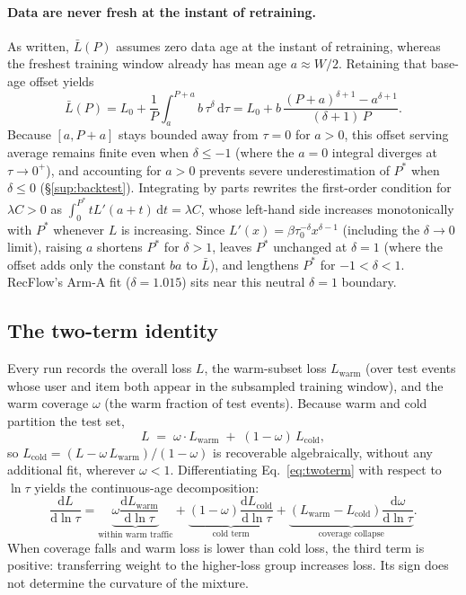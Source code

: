 \documentclass[10pt,letterpaper]{article}
\begin{document}
\paragraph{Data are never fresh at the instant of retraining.}
As written, $\bar L(P)$ assumes zero data age at the instant of retraining,
whereas the freshest training window already has mean age $a \approx W/2$.
Retaining that base-age offset yields
\[
\bar L(P) = L_0 + \frac{1}{P}\int_{a}^{P+a} \! b\,\tau^{\delta}\,
\mathrm{d}\tau
= L_0 + b\,\frac{(P+a)^{\delta+1} - a^{\delta+1}}{(\delta+1)\,P} .
\]
Because $[a, P+a]$ stays bounded away from $\tau = 0$ for $a > 0$, this offset
serving average remains finite even when $\delta \le -1$ (where the $a = 0$
integral diverges at $\tau \to 0^+$), and accounting for $a > 0$ prevents
severe underestimation of $P^\ast$ when $\delta \le 0$ (\S\ref{sup:backtest}).
Integrating by parts rewrites the first-order condition for $\lambda C > 0$ as
$\int_0^{P^\ast} t L'(a+t)\,\mathrm{d}t = \lambda C$, whose left-hand side
increases monotonically with $P^\ast$ whenever $L$ is increasing. Since
$L'(x) = \beta\tau_0^{-\delta}x^{\delta-1}$ (including the $\delta \to 0$
limit), raising $a$ shortens $P^\ast$ for $\delta > 1$, leaves $P^\ast$
unchanged at $\delta = 1$ (where the offset adds only the constant $ba$ to
$\bar L$), and lengthens $P^\ast$ for $-1 < \delta < 1$. RecFlow's Arm-A fit
($\delta = 1.015$) sits near this neutral $\delta = 1$ boundary.

\subsection{The two-term identity}

Every run records the overall loss $L$, the warm-subset loss
$L_{\mathrm{warm}}$ (over test events whose user and item both appear in the
subsampled training window), and the warm coverage $\omega$ (the warm fraction
of test events). Because warm and cold partition the test set,
\begin{equation}
L \;=\; \omega \cdot L_{\mathrm{warm}} \;+\; (1 - \omega)\,L_{\mathrm{cold}},
\label{eq:twoterm}
\end{equation}
so $L_{\mathrm{cold}} = (L - \omega\,L_{\mathrm{warm}})/(1 - \omega)$ is
recoverable algebraically, without any additional fit, wherever
$\omega < 1$. Differentiating Eq.~\eqref{eq:twoterm} with respect to
$\ln\tau$ yields the continuous-age decomposition:
\[
\frac{\mathrm{d}L}{\mathrm{d}\ln\tau}
= \underbrace{\omega \frac{\mathrm{d}L_{\mathrm{warm}}}{\mathrm{d}\ln\tau}}
  _{\text{within warm traffic}}
+ \underbrace{(1-\omega)\frac{\mathrm{d}L_{\mathrm{cold}}}{\mathrm{d}\ln\tau}}
  _{\text{cold term}}
+ \underbrace{(L_{\mathrm{warm}} - L_{\mathrm{cold}})
  \frac{\mathrm{d}\omega}{\mathrm{d}\ln\tau}}_{\text{coverage collapse}} .
\]
When coverage falls and warm loss is lower than cold loss, the third term
is positive: transferring weight to the higher-loss group increases loss.
Its sign does not determine the curvature of the mixture.
\end{document}
